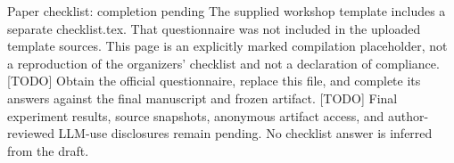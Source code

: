 Paper checklist: completion pending
The supplied workshop template includes a separate checklist.tex. That questionnaire was not
included in the uploaded template sources. This page is an explicitly marked compilation placeholder,
not a reproduction of the organizers’ checklist and not a declaration of compliance.
[TODO] Obtain the official questionnaire, replace this file, and complete its answers against the final
manuscript and frozen artifact.
[TODO] Final experiment results, source snapshots, anonymous artifact access, and author-reviewed
LLM-use disclosures remain pending. No checklist answer is inferred from the draft.




